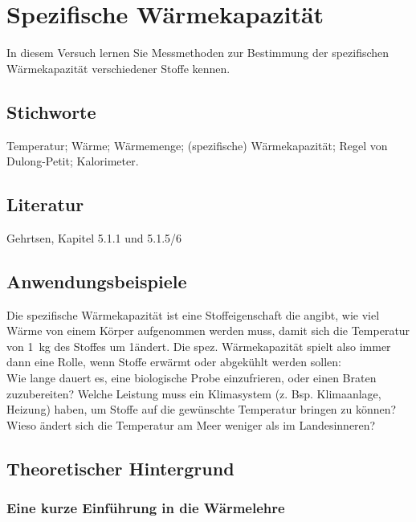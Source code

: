 \chapter{Spezifische Wärmekapazität}
\label{v:5}

In diesem Versuch lernen Sie Messmethoden zur Bestimmung der spezifischen Wärmekapazität verschiedener Stoffe kennen.

\section{Stichworte}
Temperatur; Wärme; Wärmemenge; (spezifische) Wärmekapazität; Regel von Dulong-Petit; Kalorimeter.
%
\section{Literatur}
Gehrtsen, Kapitel 5.1.1 und 5.1.5/6
%
\section{Anwendungsbeispiele}
%
Die spezifische Wärmekapazität ist eine Stoffeigenschaft die angibt, wie viel Wärme von einem Körper aufgenommen werden muss, damit sich die Temperatur von 1~kg des Stoffes um 1\degree ändert. Die spez. Wärmekapazität spielt also immer dann eine Rolle, wenn Stoffe erwärmt oder abgekühlt werden sollen:\\
Wie lange dauert es, eine biologische Probe einzufrieren, oder einen Braten zuzubereiten? Welche Leistung muss ein Klimasystem (z. Bsp. Klimaanlage, Heizung) haben, um Stoffe auf die gewünschte Temperatur bringen zu können? Wieso ändert sich die Temperatur am Meer weniger als im Landesinneren?
%
\section{Theoretischer Hintergrund}

\subsection{Eine kurze Einführung in die Wärmelehre}

